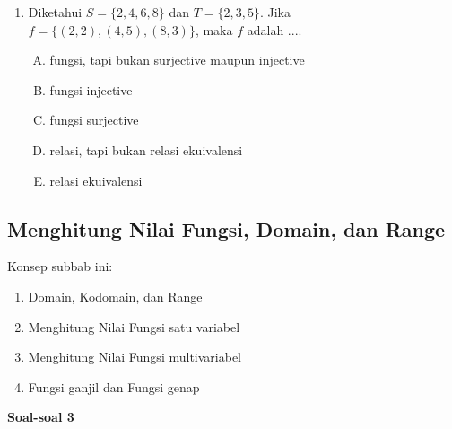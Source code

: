 \documentclass[fleqn, a4paper, 12pt]{article} %
\begin{document}
\begin{enumerate}
		\newpage
		
		\item Diketahui $S = \{2, 4, 6, 8\}$ dan $T = \{2, 3, 5\}$. Jika $f = \{(2, 2), (4, 5), (8, 3)\}$, maka $f$ adalah ....
		\begin{enumerate}[(A)]
			\item fungsi, tapi bukan surjective maupun injective
			\item fungsi injective
			\item fungsi surjective
			\item relasi, tapi bukan relasi ekuivalensi
			\item relasi ekuivalensi
		\end{enumerate}
	\end{enumerate}
	
	\subsection{Menghitung Nilai Fungsi, Domain, dan Range}
	
		Konsep subbab ini:
		
		\begin{enumerate}
			\item Domain, Kodomain, dan Range
			\item Menghitung Nilai Fungsi satu variabel
			\item Menghitung Nilai Fungsi multivariabel
			\item Fungsi ganjil dan Fungsi genap			
		\end{enumerate}
	
	\textbf{Soal-soal 3}
	
\end{document}
